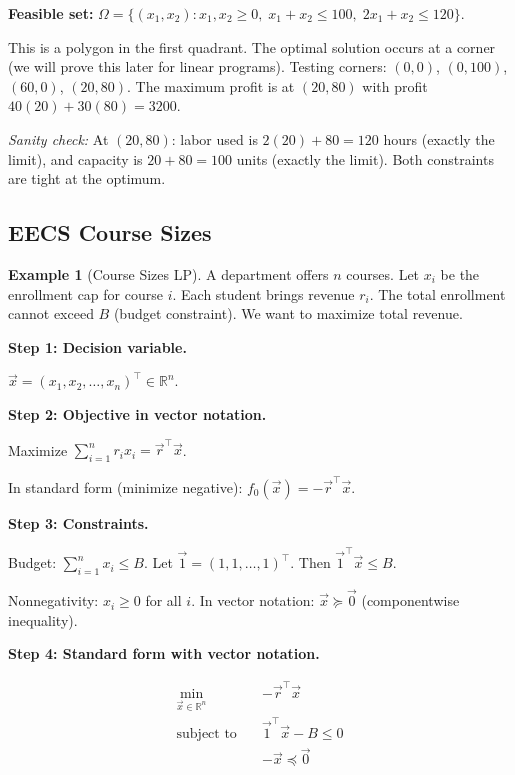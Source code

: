 \documentclass[10pt, twocolumn]{article}
\theoremstyle{definition}
\newtheorem{example}{Example}
\theoremstyle{plain}
\newcommand{\RR}{\mathbb{R}}
\begin{document}
\textbf{Feasible set:} $\Omega = \{(x_1, x_2) : x_1, x_2 \ge 0, \; x_1 + x_2 \le 100, \; 2x_1 + x_2 \le 120\}$.

This is a polygon in the first quadrant. The optimal solution occurs at a corner (we will prove this later for linear programs). Testing corners: $(0, 0)$, $(0, 100)$, $(60, 0)$, $(20, 80)$. The maximum profit is at $(20, 80)$ with profit $40(20) + 30(80) = 3200$.

\textit{Sanity check:} At $(20, 80)$: labor used is $2(20) + 80 = 120$ hours (exactly the limit), and capacity is $20 + 80 = 100$ units (exactly the limit). Both constraints are tight at the optimum. \checkmark

\subsection{EECS Course Sizes}

\begin{example}[Course Sizes LP]
A department offers $n$ courses. Let $x_i$ be the enrollment cap for course $i$. Each student brings revenue $r_i$. The total enrollment cannot exceed $B$ (budget constraint). We want to maximize total revenue.
\end{example}

\textbf{Step 1: Decision variable.}

$\vec{x} = (x_1, x_2, \ldots, x_n)^\top \in \RR^n$.

\textbf{Step 2: Objective in vector notation.}

Maximize $\sum_{i=1}^n r_i x_i = \vec{r}^\top \vec{x}$.

In standard form (minimize negative): $f_0(\vec{x}) = -\vec{r}^\top \vec{x}$.

\textbf{Step 3: Constraints.}

Budget: $\sum_{i=1}^n x_i \le B$. Let $\vec{1} = (1, 1, \ldots, 1)^\top$. Then $\vec{1}^\top \vec{x} \le B$.

Nonnegativity: $x_i \ge 0$ for all $i$. In vector notation: $\vec{x} \succeq \vec{0}$ (componentwise inequality).

\textbf{Step 4: Standard form with vector notation.}

\begin{result}
\[
\begin{aligned}
    \min_{\vec{x} \in \RR^n} \quad & -\vec{r}^\top \vec{x} \\
    \text{subject to} \quad & \vec{1}^\top \vec{x} - B \le 0 \\
    & -\vec{x} \preceq \vec{0}
\end{aligned}
\]
\end{result}
\end{document}
